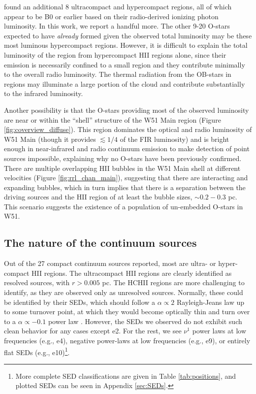\citet{Mehringer1994a} found an additional 8 ultracompact and hypercompact \hii
regions, all of which appear to be B0 or earlier based on their radio-derived
ionizing photon luminosity.  In this work, we report a handful more.
The other 9-20 O-stars expected to have \emph{already} formed given the
observed total luminosity may be these most luminous hypercompact \hii regions.
However, it is difficult to explain the total luminosity of the region from
hypercompact HII regions alone, since their emission is necessarily confined to
a small region and they contribute minimally to the overall radio luminosity.
The thermal radiation from the OB-stars in \hii regions may illuminate a large
portion of the cloud and contribute substantially to the infrared luminosity.

Another possibility is that the O-stars providing most of the observed
luminosity are near or within the ``shell'' structure of the W51 Main region
(Figure \ref{fig:coverview_diffuse}).  This region dominates the optical and
radio luminosity of W51 Main (though it provides $\lesssim 1/4$ of the FIR
luminosity) and is bright enough in near-infrared and radio continuum emission
to make detection of point sources impossible, explaining why no O-stars have
been previously confirmed.  There are multiple overlapping HII bubbles in the
W51 Main shell at different velocities (Figure \ref{fig:rrl_chan_main}),
suggesting that there are interacting and  expanding bubbles, which in turn
implies that there is a separation between the driving sources and the HII
region of at least the bubble sizes, $\sim0.2-0.3$ pc.  This scenario suggests
the existence of a population of un-embedded O-stars in W51.  

\subsection{The nature of the continuum sources}
Out of the 27 compact continuum sources reported, most are ultra- or
hyper-compact HII regions.  The ultracompact HII regions are clearly
identified as resolved sources, with $r>0.005$ pc.  The HCHII regions
are more challenging to identify, as they are observed only as unresolved
sources.  Normally, these could be identified by their SEDs, which should
follow a $\alpha\propto2$ Rayleigh-Jeans law up to some turnover point, at which
they would become optically thin and turn over to a $\alpha\propto{-0.1}$ power law
\citep{Wilson2009a}.  However, the SEDs we observed do not exhibit such clean
behavior for any cases except e2.  For the rest, we see $\nu^1$ power laws at
low frequencies (e.g., e4), negative power-laws at low frequencies (e.g.,
e9), or entirely flat SEDs (e.g., e10)\footnote{More complete SED classifications
are given in Table \ref{tab:positions}, and plotted SEDs can be seen in
Appendix \ref{sec:SEDs}.}.


